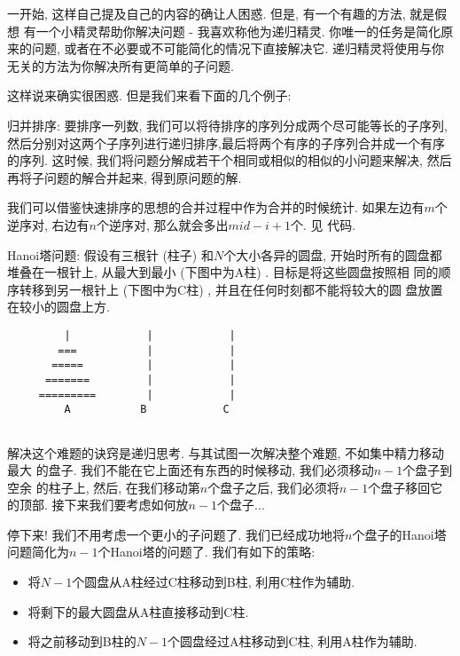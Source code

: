 一开始, 这样自己提及自己的内容的确让人困惑. 但是, 有一个有趣的方法, 就是假想
有一个小精灵帮助你解决问题 - 我喜欢称他为递归精灵. 
你唯一的任务是简化原来的问题, 或者在不必要或不可能简化的情况下直接解决它. 
递归精灵将使用与你无关的方法为你解决所有更简单的子问题. 

这样说来确实很困惑. 但是我们来看下面的几个例子: 

\begin{example}
    归并排序: 要排序一列数, 我们可以将待排序的序列分成两个尽可能等长的子序列,
    然后分别对这两个子序列进行递归排序,最后将两个有序的子序列合并成一个有序的序列.
    这时候, 我们将问题分解成若干个相同或相似的相似的小问题来解决, 
    然后再将子问题的解合并起来, 得到原问题的解. 
\end{example}

 我们可以借鉴快速排序的思想的合并过程中作为合并的时候统计. 
如果左边有$m$个逆序对, 右边有$n$个逆序对, 那么就会多出$mid-i+1$个. 见
代码. 

\begin{example}
    Hanoi塔问题: 假设有三根针 (柱子) 和$N$个大小各异的圆盘, 开始时所有的圆盘都
    堆叠在一根针上, 从最大到最小 (下图中为A柱) . 目标是将这些圆盘按照相
    同的顺序转移到另一根针上 (下图中为C柱) , 并且在任何时刻都不能将较大的圆
    盘放置在较小的圆盘上方. 
    \begin{lstlisting}
         |            |            |
        ===           |            |
       =====          |            |
      =======         |            |
     =========        |            |
         A           B            C
    
    \end{lstlisting}
\end{example}

解决这个难题的诀窍是递归思考. 与其试图一次解决整个难题, 不如集中精力移动最大
的盘子. 我们不能在它上面还有东西的时候移动, 我们必须移动$n-1$个盘子到空余
的柱子上, 然后, 在我们移动第$n$个盘子之后, 我们必须将$n-1$个盘子移回它的顶部. 
接下来我们要考虑如何放$n-1$个盘子... 

停下来! 我们不用考虑一个更小的子问题了. 我们已经成功地将$n$个盘子的Hanoi塔
问题简化为$n-1$个Hanoi塔的问题了. 我们有如下的策略: 
\begin{itemize}[noitemsep]
    \item 将$N-1$个圆盘从A柱经过C柱移动到B柱, 利用C柱作为辅助. 
    \item 将剩下的最大圆盘从A柱直接移动到C柱. 
    \item 将之前移动到B柱的$N-1$个圆盘经过A柱移动到C柱, 利用A柱作为辅助. 
\end{itemize} 


